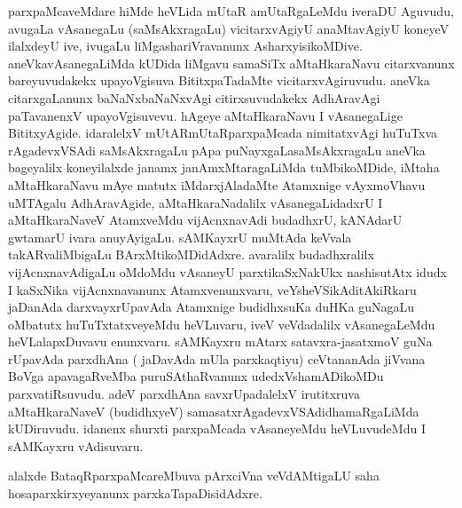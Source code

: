 \begin{artha}
parxpaMcaveMdare hiMde heVLida mUtaR amUtaRgaLeMdu iveraDU  Aguvudu,
avugaLa vAsanegaLu (saMsAkxragaLu) vicitarxvAgiyU anaMtavAgiyU
koneyeV ilalxdeyU ive, ivugaLu liMgashariVravanunx
AsharxyisikoMDive. aneVkavAsanegaLiMda kUDida liMgavu samaSiTx
aMtaHkaraNavu citarxvanunx bareyuvudakekx
upayoVgisuva BititxpaTadaMte vicitarxvAgiruvudu. aneVka citarxgaLanunx baNaNxbaNaNxvAgi
citirxsuvudakekx AdhAravAgi paTavanenxV upayoVgisuvevu. hAgeye
aMtaHkaraNavu I vAsanegaLige BititxyAgide. idaralelxV
mUtARmUtaRparxpaMcada nimitatxvAgi huTuTxva rAgadevxVSAdi
saMsAkxragaLu pApa puNayxgaLasaMsAkxragaLu aneVka bageyalilx
koneyilalxde janamx janAmxMtaragaLiMda tuMbikoMDide, iMtaha
aMtaHkaraNavu mAye matutx iMdarxjAladaMte Atamxnige vAyxmoVhavu
uMTAgalu AdhAravAgide, aMtaHkaraNadalilx vAsanegaLidadxrU I
aMtaHkaraNaveV AtamxveMdu vijAcnxnavAdi budadhxrU, kANAdarU gwtamarU
ivara anuyAyigaLu. sAMKayxrU muMtAda keVvala  takARvaliMbigaLu
BArxMtikoMDidAdxre. avaralilx budadhxralilx vijAcnxnavAdigaLu oMdoMdu
vAsaneyU parxtikaSxNakUkx nashisutAtx idudx I kaSxNika vijAcnxnavanunx
Atamxvenunxvaru, veYsheVSikAditAkiRkaru jaDanAda darxvayxrUpavAda
Atamxnige budidhxsuKa duHKa guNagaLu oMbatutx huTuTxtatxveyeMdu
heVLuvaru, iveV veVdadalilx vAsanegaLeMdu heVLalapxDuvavu
enunxvaru. sAMKayxru mAtarx satavxra-jasatxmoV guNa rUpavAda
parxdhAna ( jaDavAda mUla parxkaqtiyu) ceVtananAda jiVvana BoVga
apavagaRveMba puruSAthaRvanunx udedxVshamADikoMDu
parxvatiRsuvudu. adeV parxdhAna savxrUpadalelxV irutitxruva
aMtaHkaraNaveV (budidhxyeV) samasatxrAgadevxVSAdidhamaRgaLiMda
kUDiruvudu. idanenx shurxti parxpaMcada vAsaneyeMdu heVLuvudeMdu I
sAMKayxru vAdisuvaru.

alalxde BataqRparxpaMcareMbuva pArxciVna veVdAMtigaLU saha
hosaparxkirxyeyanunx parxkaTapaDisidAdxre.
\end{artha}

\centerline{}

